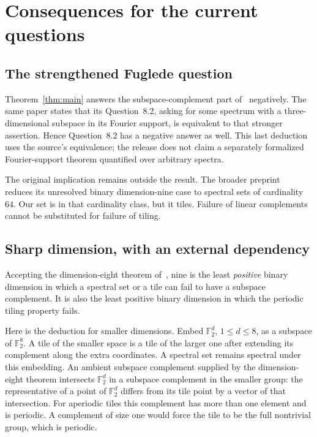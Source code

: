 \documentclass[11pt]{article}
\theoremstyle{definition}\newtheorem{definition}[theorem]{Definition}
\theoremstyle{remark}\newtheorem{remark}[theorem]{Remark}
\newcommand{\F}{\mathbb F}
\begin{document}
\section{Consequences for the current questions}

\subsection{The strengthened Fuglede question}

Theorem~\ref{thm:main} answers the subspace-complement part of~\cite[Question~8.1]{fi8} negatively. The same paper states that its Question~8.2, asking for some spectrum with a three-dimensional subspace in its Fourier support, is equivalent to that stronger assertion. Hence Question~8.2 has a negative answer as well. This last deduction uses the source's equivalence; the release does not claim a separately formalized Fourier-support theorem quantified over arbitrary spectra.

The original implication remains outside the result. The broader preprint~\cite{fi9} reduces its unresolved binary dimension-nine case to spectral sets of cardinality $64$. Our set is in that cardinality class, but it tiles. Failure of linear complements cannot be substituted for failure of tiling.

\subsection{Sharp dimension, with an external dependency}

Accepting the dimension-eight theorem of~\cite[Theorem~1.1]{fi8}, nine is the least \emph{positive} binary dimension in which a spectral set or a tile can fail to have a subspace complement. It is also the least positive binary dimension in which the periodic tiling property fails.

Here is the deduction for smaller dimensions. Embed $\F_2^d$, $1\leq d\leq8$, as a subspace of $\F_2^8$. A tile of the smaller space is a tile of the larger one after extending its complement along the extra coordinates. A spectral set remains spectral under this embedding. An ambient subspace complement supplied by the dimension-eight theorem intersects $\F_2^d$ in a subspace complement in the smaller group: the representative of a point of $\F_2^d$ differs from its tile point by a vector of that intersection. For aperiodic tiles this complement has more than one element and is periodic. A complement of size one would force the tile to be the full nontrivial group, which is periodic.
\end{document}
